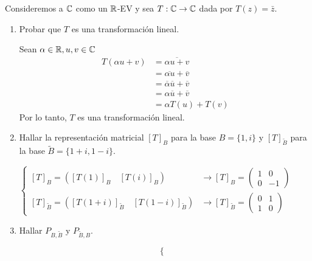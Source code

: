 \item Consideremos a $\mathbb{C}$ como un $\mathbb{R}$-EV y sea $T:\mathbb{C}\to\mathbb{C}$ dada por $T(z)=\bar{z}$.
    \begin{enumerate}
        \item Probar que $T$ es una transformación lineal.
            \begin{mdframed}[style=s]
                Sean $\alpha\in\mathbb{R},u,v\in\mathbb{C}$
                \begin{align*}
                    T(\alpha u+v)&=\overline{\alpha u+v}\\
                    &=\overline{\alpha u}+\overline{v}\\
                    &=\overline{\alpha}\overline{u}+\overline{v}\\
                    &=\alpha \overline{u}+\overline{v}\\
                    &=\alpha T(u)+T(v)
                \end{align*}
                Por lo tanto, $T$ es una transformación lineal.
            \end{mdframed}
        \item Hallar la representación matricial $[T]_B$ para la base $B=\{1,i\}$ y $[T]_{\tilde{B}}$ para la base $\tilde{B}=\{1+i,1-i\}$.
            \begin{mdframed}[style=s]
                \begin{center}
                    $\begin{cases}
                        [T]_B=\left([T(1)]_B\quad[T(i)]_B\right)&\to[T]_B=\begin{pmatrix}
                            1&0\\0&-1
                        \end{pmatrix}\\
                        [T]_{\tilde{B}}=\left([T(1+i)]_{\tilde{B}}\quad[T(1-i)]_{\tilde{B}}\right)&\to[T]_{\tilde{B}}=\begin{pmatrix}
                            0&1\\1&0
                        \end{pmatrix}
                    \end{cases}$
                \end{center}
            \end{mdframed}
        \item Hallar $P_{B,\tilde{B}}$ y $P_{\tilde{B},B}$.
            \begin{mdframed}[style=s]
                \[\begin{cases}

\end{cases}\]
\end{mdframed}
\end{enumerate}
